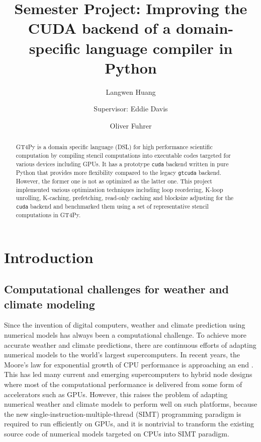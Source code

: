 \documentclass[]{article}
\title{Semester Project: Improving the CUDA backend of a domain-specific language compiler in Python}
\author[1]{Langwen Huang}
\author[2]{Supervisor: Eddie Davis}
\author[2]{Oliver Fuhrer}
\affil[1]{Department of Mathematics, ETH Zurich}
\affil[2]{Vulcan Inc.}
\begin{document}
\maketitle

\begin{abstract}
GT4Py is a domain specific language (DSL) for high performance scientific computation by compiling stencil computations into executable codes targeted for various devices including GPUs. It has a prototype \texttt{cuda} backend written in pure Python that provides more flexibility compared to the legacy \texttt{gtcuda} backend. However, the former one is not as optimized as the latter one. This project implemented various optimization techniques including loop reordering, K-loop unrolling, K-caching, prefetching, read-only caching and blocksize adjusting for the \texttt{cuda} backend and benchmarked them using a set of representative stencil computations in GT4Py.
\end{abstract}

\newpage
\tableofcontents
\newpage

\section{Introduction}

\subsection{Computational challenges for weather and climate modeling}
Since the invention of digital computers, weather and climate prediction using numerical models has always been a computational challenge. To achieve more accurate weather and climate predictions, there are continuous efforts of adapting numerical models to the world's largest supercomputers. In recent years, the Moore's law for exponential growth of CPU performance is approaching an end \citep{Theis2017}. This has led many current and emerging supercomputers to hybrid node designs where most of the computational performance is delivered from some form of accelerators such as GPUs. However, this raises the problem of adapting numerical weather and climate models to perform well on such platforms, because the new single-instruction-multiple-thread (SIMT) programming paradigm is required to run efficiently on GPUs, and it is nontrivial to transform the existing source code of numerical models targeted on CPUs into SIMT paradigm.
\end{document}
